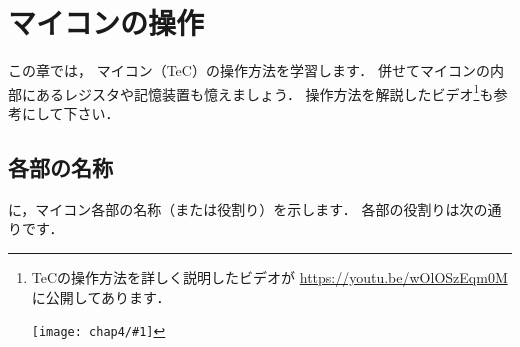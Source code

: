 \renewcommand{\myincludegraphics}[2]{\texttt{[image: chap4/\#1]}}

\chapter{マイコンの操作\label{sousa}}

この章では，
マイコン（TeC）の操作方法を学習します．
併せてマイコンの内部にあるレジスタや記憶装置も憶えましょう．
操作方法を解説したビデオ\footnote{
\begin{minipage}[t]{0.9\columnwidth}
\begin{minipage}{0.75\columnwidth}
TeCの操作方法を詳しく説明したビデオが
\url{https://youtu.be/wOlOSzEqm0M}に公開してあります．
\end{minipage}\hfill
\begin{minipage}{0.2\columnwidth}
\myincludegraphics{QR2.png}{scale=0.3}
\end{minipage}
\end{minipage}
}も参考にして下さい．

\section{各部の名称}
に，マイコン各部の名称（または役割り）を示します．
各部の役割りは次の通りです．


